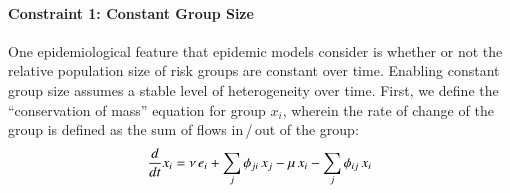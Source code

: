 \paragraph{Constraint 1: Constant Group Size}			%
One epidemiological feature that epidemic models consider
is whether or not the relative population size of risk groups are constant over time. %
Enabling constant group size assumes a stable level of heterogeneity over time.   %
First, we define the ``conservation of mass'' equation for group $x_i$,
wherein the rate of change of the group
is defined as the sum of flows in\,/\,out of the group:
\begin{equation}\label{eq:mass-balance}
\frac{d}{dt}x_i
= \nu \thinspace e_i + \sum_{j}{\phi_{ji} \thinspace x_j}
- \mu \thinspace x_i - \sum_{j}{\phi_{ij} \thinspace x_i}
\end{equation}

